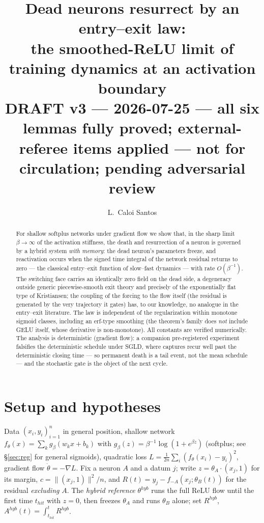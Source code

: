 \documentclass[11pt]{article}
\title{Dead neurons resurrect by an entry--exit law:\\ the smoothed-ReLU limit of
training dynamics at an activation boundary\\ \large DRAFT v3 --- 2026-07-25 --- all six lemmas fully proved; external-referee items applied ---
not for circulation; pending adversarial review}
\author{L.~Caloi Santos}
\date{}
\begin{document}
\maketitle

\begin{abstract}
For shallow softplus networks under gradient flow we show that, in the sharp
limit $\beta\to\infty$ of the activation stiffness, the death and resurrection
of a neuron is governed by a hybrid system \emph{with memory}: the dead
neuron's parameters freeze, and reactivation occurs when the signed time
integral of the network residual returns to zero --- the classical entry--exit
function of slow--fast dynamics --- with rate $O(\beta^{-1})$. The switching
face carries an identically zero field on the dead side, a degeneracy outside
generic piecewise-smooth exit theory and precisely of the exponentially flat
type of Kristiansen; the coupling of the forcing to the flow itself
(the residual is generated by the very trajectory it gates) has, to our
knowledge, no analogue in the entry--exit literature. The law is independent
of the regularization within monotone sigmoid classes, including an erf-type
smoothing (the theorem's family does \emph{not} include GELU itself, whose
derivative is non-monotone). All constants are verified numerically. The
analysis is deterministic (gradient flow): a companion pre-registered
experiment falsifies the deterministic schedule under SGLD, where captures
recur well past the deterministic closing time --- so permanent death is a
tail event, not the mean schedule --- and the stochastic gate is the object
of the next cycle.
\end{abstract}

\section{Setup and hypotheses}
Data $(x_i,y_i)_{i=1}^n$ in general position, shallow network
$f_\theta(x)=\sum_k g_\beta(w_kx+b_k)$ with $g_\beta(z)=\beta^{-1}\log(1+e^{\beta z})$
(softplus; see \S\ref{sec:reg} for general sigmoids), quadratic loss
$L=\tfrac1{2n}\sum_i(f_\theta(x_i)-y_i)^2$, gradient flow $\dot\theta=-\nabla L$.
Fix a neuron $A$ and a datum $j$; write $z=\theta_A\cdot(x_j,1)$ for its margin,
$c=\|(x_j,1)\|^2/n$, and $R(t)=y_j-f_{-A}(x_j;\theta_B(t))$ for the residual
\emph{excluding} $A$. The \emph{hybrid reference} $\theta^{hyb}$ runs the full
ReLU flow until the first time $t_{hit}$ with $z=0$, then freezes $\theta_A$ and
runs $\theta_B$ alone; set $R^{hyb}$, $A^{hyb}(t)=\int_{t_{hit}}^t R^{hyb}$.
\end{document}
